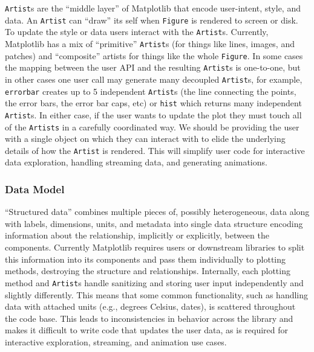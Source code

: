 \documentclass[11pt]{article}  %
\begin{document}
\texttt{Artist}s are the ``middle layer'' of Matplotlib that encode
user-intent, style, and data.  An \texttt{Artist} can ``draw'' its
self when \texttt{Figure} is rendered to screen or disk.  To update
the style or data users interact with the \texttt{Artist}s.
Currently, Matplotlib has a mix of ``primitive'' \texttt{Artist}s (for
things like lines, images, and patches) and ``composite'' artists for
things like the whole \texttt{Figure}.  In some cases the mapping
between the user API and the resulting \texttt{Artist}s is one-to-one,
but in other cases one user call may generate many decoupled
\texttt{Artist}s, for example, \texttt{errorbar} creates up to 5
independent \texttt{Artist}s (the line connecting the points, the
error bars, the error bar caps, etc) or \texttt{hist} which returns
many independent \texttt{Artist}s.  In either case, if the user wants
to update the plot they must touch all of the \texttt{Artists} in a
carefully coordinated way.  We should be providing the user with a
single object on which they can interact with to elide the underlying
details of how the \texttt{Artist} is rendered.  This will simplify
user code for interactive data exploration, handling streaming data,
and generating animations.




\subsubsection{Data Model}

``Structured data'' combines multiple pieces of, possibly
heterogeneous, data along with labels, dimensions, units, and metadata into
single data structure encoding
 information about
the relationship, implicitly or explicitly, between the components.
Currently Matplotlib requires users or downstream libraries to split
this information into its components and pass them individually to
plotting methods, destroying the structure and relationships.
Internally, each plotting method and \texttt{Artist}s handle sanitizing and
storing user input independently and slightly differently.
This means that some common functionality, such as handling data with
attached units (e.g., degrees Celsius, dates), is scattered throughout the
code base.
This leads to inconsistencies in behavior across the library and makes
it difficult to write code that updates the user data, as is required
for interactive exploration, streaming, and animation use cases.
\end{document}
